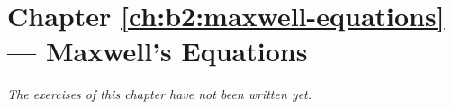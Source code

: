 \section*{Chapter \ref{ch:b2:maxwell-equations} --- Maxwell's Equations}


\emph{The exercises of this chapter have not been written yet.}
